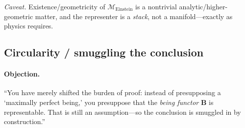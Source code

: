 \documentclass[11pt]{article}
\theoremstyle{upright}
\begin{document}
\emph{Caveat.} Existence/geometricity of \(\mathcal M_{\mathrm{Einstein}}\) is a nontrivial analytic/higher-geometric matter, and the representer is a \emph{stack}, not a manifold—exactly as physics requires.

\subsection{Circularity / smuggling the conclusion}
\paragraph{Objection.}
“You have merely shifted the burden of proof: instead of presupposing a `maximally perfect being,' you presuppose that the \emph{being functor} \(\mathbf B\) is representable. That is still an assumption—so the conclusion is smuggled in by construction.”
\end{document}
